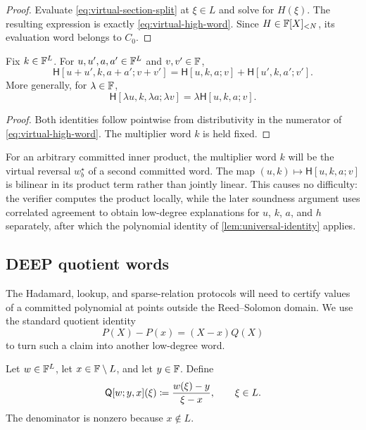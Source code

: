 \begin{proof}
Evaluate \eqref{eq:virtual-section-split} at $\xi\in L$ and solve for $H(\xi)$.  The resulting expression is exactly \eqref{eq:virtual-high-word}.  Since $H\in\mathbb{F}[X]_{<N}$, its evaluation word belongs to $C_0$.
\end{proof}

\begin{lemma}
\label{lem:virtual-high-linearity}
Fix $k\in\mathbb{F}^L$.  For $u,u',a,a'\in\mathbb{F}^L$ and $v,v'\in\mathbb{F}$,
\begin{equation}
  \mathsf H[u+u',k,a+a';v+v']
  =\mathsf H[u,k,a;v]+\mathsf H[u',k,a';v'].
  \label{eq:virtual-high-linearity}
\end{equation}
More generally, for $\lambda\in\mathbb{F}$,
\[
  \mathsf H[\lambda u,k,\lambda a;\lambda v]
  =\lambda\mathsf H[u,k,a;v].
\]
\end{lemma}

\begin{proof}
Both identities follow pointwise from distributivity in the numerator of \eqref{eq:virtual-high-word}.  The multiplier word $k$ is held fixed.
\end{proof}

\begin{remark}
\label{rem:committed-second-factor}
For an arbitrary committed inner product, the multiplier word $k$ will be the virtual reversal $w_b^{\star}$ of a second committed word.  The map $(u,k)\mapsto \mathsf H[u,k,a;v]$ is bilinear in its product term rather than jointly linear.  This causes no difficulty: the verifier computes the product locally, while the later soundness argument uses correlated agreement to obtain low-degree explanations for $u$, $k$, $a$, and $h$ separately, after which the polynomial identity of \cref{lem:universal-identity} applies.
\end{remark}

\subsection{DEEP quotient words}
\label{sec:deep-quotients}

The Hadamard, lookup, and sparse-relation protocols will need to certify values of a committed polynomial at points outside the Reed--Solomon domain.  We use the standard quotient identity
\[
  P(X)-P(x)=(X-x)Q(X)
\]
to turn such a claim into another low-degree word.

\begin{definition}
\label{def:deep-quotient-word}
Let $w\in\mathbb{F}^L$, let $x\in\mathbb{F}\setminus L$, and let $y\in\mathbb{F}$.  Define
\begin{equation}
  \mathsf Q[w;y,x](\xi)
  \coloneqq
  \frac{w(\xi)-y}{\xi-x},
  \qquad \xi\in L.
  \label{eq:deep-quotient-word}
\end{equation}
The denominator is nonzero because $x\notin L$.
\end{definition}

